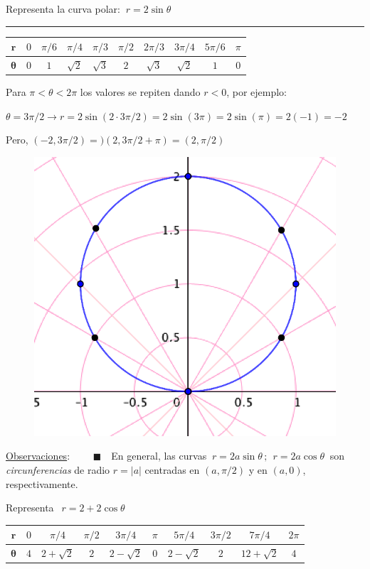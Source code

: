 \begin{miejercicio} 
	
Representa la curva polar: $\ r=2\sin \theta$

 \rule{300pt}{0.2pt}


\begin{table}[H]
\centering
\begin{tabular}{c|ccccccccc}
$\boldsymbol{r}$ & $0$ & $\pi/6$ & $\pi/4$  & $\pi/3$ & $\pi/2$ & $2\pi/3$ & $3\pi/4$ & $5\pi/6$ & $\pi$ \\ \hline
$\boldsymbol{\theta}$ & $0$ & $1$ & $\sqrt 2$ & $\sqrt 3$ & $2$ & $\sqrt 3$ & $\sqrt 2$ & $1$ & $0$
\end{tabular}
\end{table}

\begin{multicols}{2}
Para $\pi<\theta<2\pi$ los valores se repiten dando $r<0$, por ejemplo:

$\theta=3\pi/2 \to r=2\sin (2\cdot 3\pi/2)=2\sin(3\pi)=2\sin(\pi)=2(-1)=-2$

Pero, $(-2,3\pi/2)=)(2,3\pi/2+\pi)=(2,\pi/2)$
\begin{figure}[H]
	\centering
	\includegraphics[width=.3\textwidth]{img-polares/polares25.png}
\end{figure}	
\end{multicols}
\end{miejercicio}

\underline{Observaciones}: \tiny{$\qquad \blacksquare \quad $}\normalsize{En} general, las curvas $\ r=2a \sin \theta\, ;\ \ r=2a\cos \theta \ $ son \emph{circunferencias} de radio $r=|a|$ centradas en $(a,\pi/2)$ y en $(a,0)$, respectivamente.



\vspace{5mm}

\begin{mipropuesto}

Representa $\ \ r=2+2\cos \theta$
\end{mipropuesto}
\begin{table}[H]
\centering
\begin{tabular}{c|ccccccccc}
$\boldsymbol{r}$ & $0$ & $\pi/4$ & $\pi/2$ & $3\pi/4$ & $\pi$ & $5\pi/4$ & $3\pi/2$ & $7\pi/4$ &  $2\pi$\\ \hline
$\boldsymbol{\theta}$ & $4$ & $2+\sqrt 2$ & $2$ & $2-\sqrt 2$ & $0$ & $2-\sqrt 2$ & $2$ & $12+\sqrt 2$ & $4$
\end{tabular}
\end{table}

